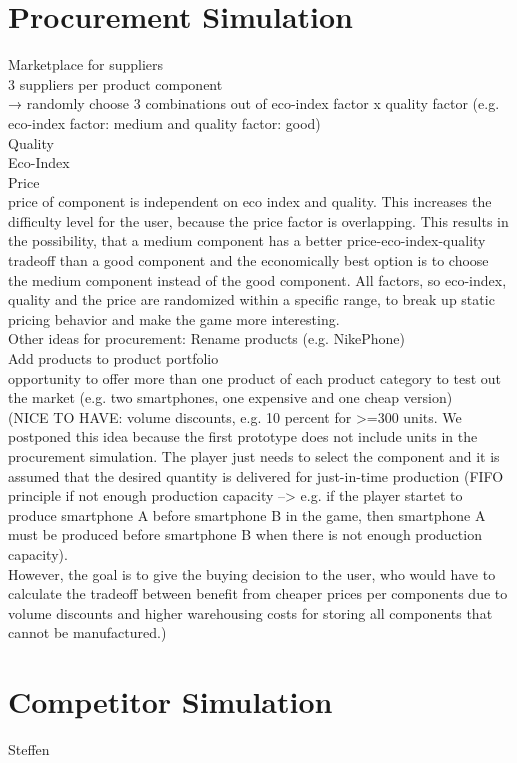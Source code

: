 \documentclass[11pt,titlepage,oneside,openany]{book}
\begin{document}
\section{Procurement Simulation}
Marketplace for suppliers \\
3 suppliers per product component \\
→ randomly choose 3 combinations out of eco-index factor x quality factor (e.g. eco-index factor: medium and quality factor: good)\\
Quality \\
Eco-Index \\
Price \\
price of component is independent on eco index and quality. This increases the difficulty level for the user, because the price factor is overlapping. This results in the possibility, that a medium component has a better price-eco-index-quality tradeoff than a good component and the economically best option is to choose the medium component instead of the good component. All factors, so eco-index, quality and the price are randomized within a specific range, to break up static pricing behavior and make the game more interesting.\\
Other ideas for procurement: Rename products (e.g. NikePhone) \\
Add products to product portfolio \\
opportunity to offer more than one product of each product category to test out the market (e.g. two smartphones, one expensive and one cheap version)\\
(NICE TO HAVE: volume discounts, e.g. 10 percent for >=300 units. We postponed this idea because the first prototype does not include units in the procurement simulation. The player just needs to select the component and it is assumed that the desired quantity is delivered for just-in-time production (FIFO principle if not enough production capacity --> e.g. if the player startet to produce smartphone A before smartphone B in the game, then smartphone A must be produced before smartphone B when there is not enough production capacity). \\
However, the goal is to give the buying decision to the user, who would have to calculate the tradeoff between benefit from cheaper prices per components due to volume discounts and higher warehousing costs for storing all components that cannot be manufactured.)

\section{Competitor Simulation}
Steffen
\end{document}
